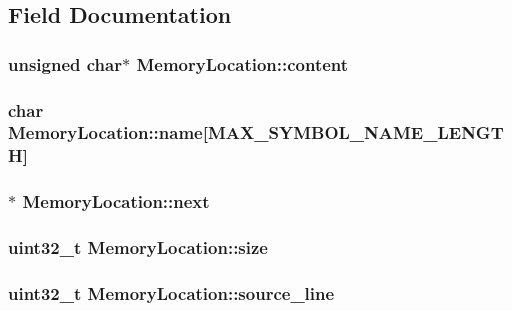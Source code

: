 \subsection{\-Field \-Documentation}
\hypertarget{struct_memory_location_afef0e80245b6dadee968d5d3dc6e5c5c}{
\subsubsection[{content}]{\setlength{\rightskip}{0pt plus 5cm}unsigned char$\ast$ {\bf \-Memory\-Location\-::content}}}\label{struct_memory_location_afef0e80245b6dadee968d5d3dc6e5c5c}
\hypertarget{struct_memory_location_a320c498b87917320483f1ad58fe686a6}{
\subsubsection[{name}]{\setlength{\rightskip}{0pt plus 5cm}char {\bf \-Memory\-Location\-::name}\mbox{[}{\bf \-M\-A\-X\-\_\-\-S\-Y\-M\-B\-O\-L\-\_\-\-N\-A\-M\-E\-\_\-\-L\-E\-N\-G\-T\-H}\mbox{]}}}\label{struct_memory_location_a320c498b87917320483f1ad58fe686a6}
\hypertarget{struct_memory_location_adacbfac647a59503828b699744046177}{
\subsubsection[{next}]{$\ast$ {\bf \-Memory\-Location\-::next}}}\label{struct_memory_location_adacbfac647a59503828b699744046177}
\hypertarget{struct_memory_location_aa261f98a2bc22ff9dd6ce65415bdbe9e}{
\subsubsection[{size}]{\setlength{\rightskip}{0pt plus 5cm}uint32\-\_\-t {\bf \-Memory\-Location\-::size}}}\label{struct_memory_location_aa261f98a2bc22ff9dd6ce65415bdbe9e}
\hypertarget{struct_memory_location_ad8776d9c07ac1dfafd46fc571800268a}{
\subsubsection[{source\-\_\-line}]{\setlength{\rightskip}{0pt plus 5cm}uint32\-\_\-t {\bf \-Memory\-Location\-::source\-\_\-line}}}\label{struct_memory_location_ad8776d9c07ac1dfafd46fc571800268a}
